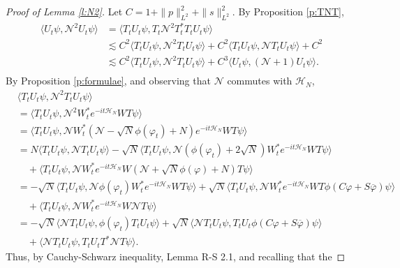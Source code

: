 \documentclass[11pt,a4paper]{scrartcl} %
\newcommand{\N}{\mathcal{N}}
\begin{document}
\begin{proof}[Proof of Lemma \ref{l:N2}]
  Let $C = 1 + \| p \|_{L^2}^2 + \| s \|_{L^2}^2$. By Proposition
  \ref{p:TNT},
  \begin{equation}
    \label{endproof4}
    \begin{aligned}
      \langle U_t \psi, \N^2 U_t \psi \rangle & = \langle T_t U_t \psi, T_t
      \N^2 T_t^* T_t U_t \psi \rangle \\
      & \apprle C^2 \langle T_t U_t \psi, \N^2 T_t U_t \psi \rangle + C^2
      \langle T_t U_t \psi, \N T_t U_t \psi \rangle + C^2 \\
      & \apprle C^2 \langle T_t U_t \psi, \N^2 T_t U_t \psi \rangle + C^3
      \langle U_t \psi, (\N+1) U_t \psi \rangle. \\
    \end{aligned}
    \end{equation} 
  By Proposition \ref{p:formulae}, and observing that $\N$ commutes with $\mathcal{H}_N$,
  \begin{align*}
    & \langle T_t U_t \psi, \N^2 T_t U_t \psi \rangle \\
    & = \langle T_t U_t \psi, \N^2 W_t^* e^{-it \mathcal{H}_N} WT \psi \rangle \\
    & = \langle T_t U_t \psi, \N W_t^* (\N - \sqrt{N} \phi(\varphi_t) + N)
    e^{-it \mathcal{H}_N} WT \psi \rangle \\
    & = N \langle T_t U_t \psi, \N T_t U_t \psi \rangle - \sqrt{N} \langle T_t
    U_t \psi, \N ( \phi(\varphi_t) + 2\sqrt{N}) W_t^* e^{-it\mathcal{H}_N} WT \psi
    \rangle \\
    & \quad + \langle T_t U_t \psi, \N W_t^* e^{-it\mathcal{H}_N} W(\N + \sqrt{N}
    \phi(\varphi) + N) T \psi \rangle \\
    & = - \sqrt{N} \langle T_t U_t \psi, \N \phi(\varphi_t) W_t^* e^{-it\mathcal{H}_N}
    WT \psi \rangle + \sqrt{N} \langle T_t U_t \psi, \N W_t^* e^{-it\mathcal{H}_N} W T
    \phi(C \varphi + S \overline{\varphi}) \psi \rangle \\
    & \quad + \langle T_t U_t \psi, \N W_t^* e^{-it\mathcal{H}_N} W \N T \psi \rangle
    \\
    & = - \sqrt{N} \langle \N T_t U_t \psi, \phi(\varphi_t) T_t U_t \psi
    \rangle + \sqrt{N} \langle \N T_t U_t \psi, T_t U_t \phi(C \varphi + S
    \overline{\varphi}) \psi \rangle \\
    & \quad + \langle \N T_t U_t \psi, T_t U_t T^* \N T \psi \rangle.
  \end{align*}
  Thus, by Cauchy-Schwarz inequality, Lemma R-S 2.1, and recalling that the

\end{proof}
\end{document}
